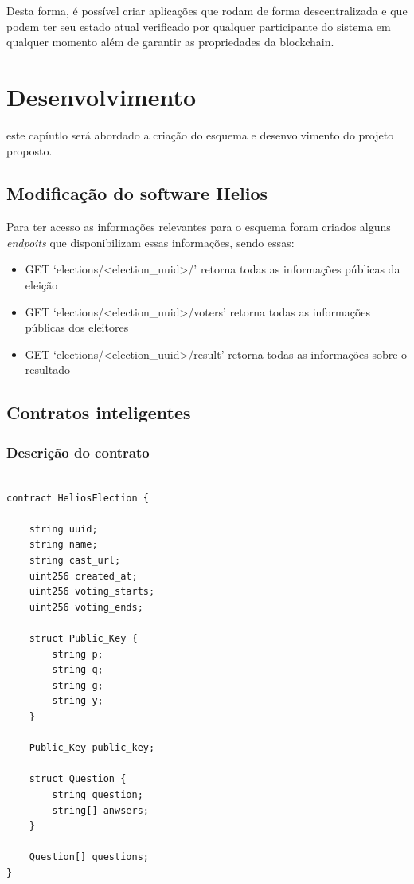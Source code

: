 \documentclass{ufsctex/ufsctex}
\begin{document}
Desta forma, é possível criar aplicações que rodam de forma descentralizada e que podem
ter seu estado atual verificado por qualquer participante do sistema em qualquer
momento além de garantir as propriedades da blockchain.


\chapter{Desenvolvimento}
este capíutlo será abordado a criação do esquema e desenvolvimento do projeto proposto.

\section{Modificação do software Helios}
Para ter acesso as informações relevantes para o esquema foram criados alguns \textit{endpoits}
que disponibilizam essas informações, sendo essas:

\begin{itemize}
	\item GET `elections/<election\_uuid>/' retorna todas as informações públicas da eleição
	\item GET `elections/<election\_uuid>/voters' retorna todas as informações públicas dos eleitores
	\item GET `elections/<election\_uuid>/result' retorna todas as informações sobre o resultado
\end{itemize}

\section{Contratos inteligentes}

\subsection{Descrição do contrato}

\begin{lstlisting}[language=Solidity]

contract HeliosElection {
    
    string uuid;
    string name;
    string cast_url;
    uint256 created_at;
    uint256 voting_starts;
    uint256 voting_ends;
    
    struct Public_Key {
        string p;
        string q;
        string g;
        string y;
    }
    
    Public_Key public_key;
    
    struct Question {
        string question;
        string[] anwsers;
    }
    
    Question[] questions;
}
\end{lstlisting}



\end{document}
